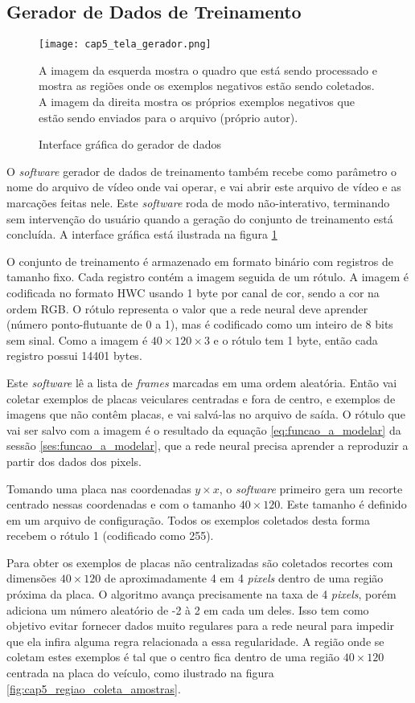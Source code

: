 \subsection{Gerador de Dados de Treinamento}

\begin{figure}[!htb]
	\centering
	\texttt{[image: cap5\_tela\_gerador.png]}
	\caption{Interface gráfica do gerador de dados}
	\label{fig:cap5_tela_gerador}
	A imagem da esquerda mostra o quadro que está sendo processado e mostra as
	regiões onde os exemplos negativos estão sendo coletados. A imagem da
	direita mostra os próprios exemplos negativos que estão sendo enviados para
	o arquivo (próprio autor).
\end{figure}

O \emph{software} gerador de dados de treinamento também recebe como parâmetro
o nome do arquivo de vídeo onde vai operar, e vai abrir este arquivo de vídeo
e as marcações feitas nele. Este \emph{software} roda de modo não-interativo,
terminando sem intervenção do usuário quando a geração do conjunto de
treinamento está concluída. A interface gráfica está ilustrada na figura
\ref{fig:cap5_tela_gerador}

O conjunto de treinamento é armazenado em formato binário com registros de
tamanho fixo. Cada registro contém a imagem seguida de um rótulo. A
imagem é codificada no formato HWC usando 1 byte por canal de cor,
sendo a cor na ordem RGB. O rótulo representa o valor que a rede neural
deve aprender (número ponto-flutuante de 0 a 1), mas é codificado como um
inteiro de
8 bits sem sinal.  Como a imagem é $40 \times 120 \times 3$ e o rótulo
tem 1 byte, então cada registro possui 14401 bytes.

Este \emph{software} lê a lista de \emph{frames} marcadas em uma ordem
aleatória. Então vai coletar exemplos de placas veiculares centradas e fora
de centro, e exemplos de imagens que não contêm placas, e vai salvá-las no
arquivo de saída. O rótulo que vai ser salvo com a imagem é o resultado da
equação \ref{eq:funcao_a_modelar} da sessão \ref{ses:funcao_a_modelar}, que
a rede neural precisa aprender a
reproduzir a partir dos dados dos pixels.

Tomando uma placa nas coordenadas $y \times x$, o \emph{software} primeiro gera
um recorte centrado nessas coordenadas e com o tamanho $40 \times 120$. Este
tamanho é definido em um arquivo de configuração. Todos os exemplos
coletados desta forma recebem o rótulo 1 (codificado como 255).

Para obter os exemplos de placas não centralizadas são coletados recortes
com dimensões $40 \times 120$ de
aproximadamente 4 em 4 \emph{pixels} dentro de uma região próxima da placa. O
algoritmo avança precisamente na taxa de 4 \emph{pixels}, porém adiciona um
número aleatório de -2 à 2 em cada um deles. Isso tem como objetivo evitar
fornecer dados muito regulares para a rede neural para impedir que ela
infira alguma regra relacionada a essa regularidade. A região onde
se coletam estes exemplos é tal que o centro fica dentro de uma região
$40 \times 120$ centrada na placa do veículo, como ilustrado na figura
\ref{fig:cap5_regiao_coleta_amostras}.

